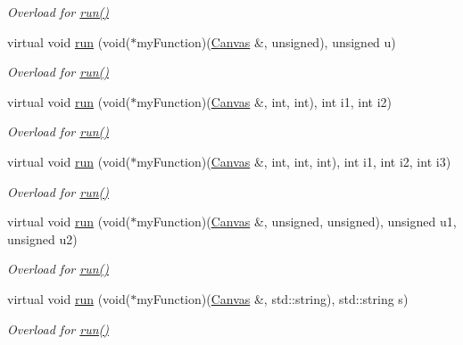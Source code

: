 \begin{DoxyCompactItemize}
\begin{DoxyCompactList}\small\item\em Overload for \hyperlink{classtsgl_1_1_canvas_a5f3f00d6c380a662a239077456045502}{run()} \end{DoxyCompactList}\item 
virtual void \hyperlink{classtsgl_1_1_canvas_a67b341ead1fde0a692281d2b1f67be1e}{run} (void($\ast$my\+Function)(\hyperlink{classtsgl_1_1_canvas}{Canvas} \&, unsigned), unsigned u)
\begin{DoxyCompactList}\small\item\em Overload for \hyperlink{classtsgl_1_1_canvas_a5f3f00d6c380a662a239077456045502}{run()} \end{DoxyCompactList}\item 
virtual void \hyperlink{classtsgl_1_1_canvas_a768c10737f9590a25d8e66dcc7137d9b}{run} (void($\ast$my\+Function)(\hyperlink{classtsgl_1_1_canvas}{Canvas} \&, int, int), int i1, int i2)
\begin{DoxyCompactList}\small\item\em Overload for \hyperlink{classtsgl_1_1_canvas_a5f3f00d6c380a662a239077456045502}{run()} \end{DoxyCompactList}\item 
virtual void \hyperlink{classtsgl_1_1_canvas_a81220477d323e6e75ef77a4e47d4cd7e}{run} (void($\ast$my\+Function)(\hyperlink{classtsgl_1_1_canvas}{Canvas} \&, int, int, int), int i1, int i2, int i3)
\begin{DoxyCompactList}\small\item\em Overload for \hyperlink{classtsgl_1_1_canvas_a5f3f00d6c380a662a239077456045502}{run()} \end{DoxyCompactList}\item 
virtual void \hyperlink{classtsgl_1_1_canvas_ab146e6cf9f7f19a047c20c02a0eb30f9}{run} (void($\ast$my\+Function)(\hyperlink{classtsgl_1_1_canvas}{Canvas} \&, unsigned, unsigned), unsigned u1, unsigned u2)
\begin{DoxyCompactList}\small\item\em Overload for \hyperlink{classtsgl_1_1_canvas_a5f3f00d6c380a662a239077456045502}{run()} \end{DoxyCompactList}\item 
virtual void \hyperlink{classtsgl_1_1_canvas_a2eeece8d4c4453ec7b4b53e209004559}{run} (void($\ast$my\+Function)(\hyperlink{classtsgl_1_1_canvas}{Canvas} \&, std\+::string), std\+::string s)
\begin{DoxyCompactList}\small\item\em Overload for \hyperlink{classtsgl_1_1_canvas_a5f3f00d6c380a662a239077456045502}{run()} \end{DoxyCompactList}\item 

\end{DoxyCompactItemize}
